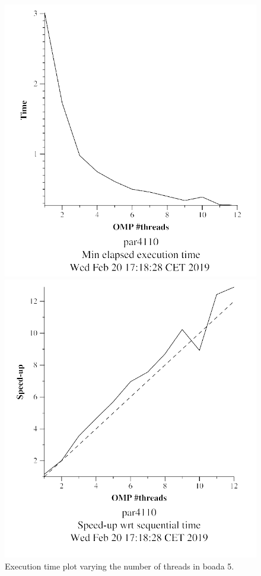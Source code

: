 \documentclass[12pt, a4paper]{article}
\begin{document}
\begin{figure}[ht]
\begin{minipage}[b]{0.45\linewidth}
\centering
\includegraphics[width=\textwidth]{./images/strong_v5_1}
\caption{Execution time plot varying the number of threads in boada 5.}
\label{fig:strong_v5_1}
\end{minipage}
\hspace{0.5cm}
\begin{minipage}[b]{0.45\linewidth}
\centering
\includegraphics[width=\textwidth]{./images/strong_v5_2}


\end{minipage}
\end{figure}
\end{document}
